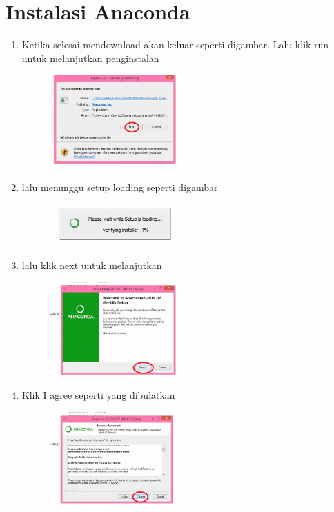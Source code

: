 \chapter*{Instalasi Anaconda}

\begin{enumerate}
	\item Ketika selesai mendownload akan keluar seperti digambar. Lalu klik run untuk melanjutkan 			penginstalan 
	\begin{figure} [h]
	\includegraphics[width=5cm]{python/1.png}
	\centering
	\end{figure}
	
	\item lalu menunggu setup loading seperti digambar 
	\begin{figure} [h]
	\includegraphics[width=5cm]{python/2.png}
	\centering
	\end{figure}

	\item lalu klik next untuk melanjutkan 
	\begin{figure} [h]
	\includegraphics[width=5cm]{python/3.png}
	\centering
	\end{figure}
	
	\item Klik I agree seperti yang dibulatkan
	\begin{figure} [h]
	\includegraphics[width=5cm]{python/4.png}
	\centering
	\end{figure}
	

\end{enumerate}
